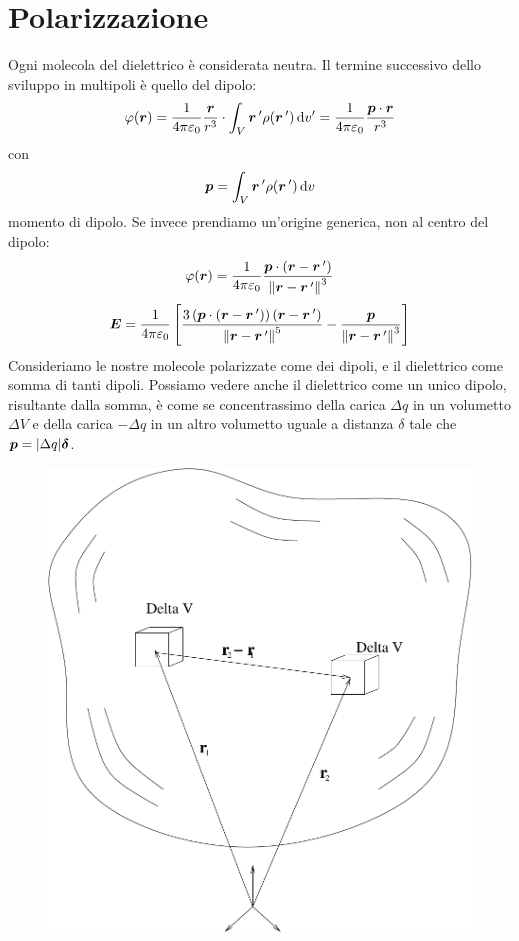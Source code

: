 \section{Polarizzazione}
Ogni molecola del dielettrico è considerata neutra. Il termine successivo dello sviluppo in multipoli è quello del dipolo:
\begin{equation}
  \varphi(\boldsymbol{r})=\frac{1}{4\pi\varepsilon_0}\frac{\boldsymbol{r}}{r^3}\cdot\int_V\boldsymbol{r}\,'\rho(\boldsymbol{r}\,')\,\mathrm{d} v'=\frac{1}{4\pi\varepsilon_0}\frac{\boldsymbol{p}\cdot\boldsymbol{r}}{r^3}
\end{equation}
con
\begin{equation}
  \boldsymbol{p}=\int_V \boldsymbol{r}\,'\rho(\boldsymbol{r}\,')\,\mathrm{d} v
\end{equation}
momento di dipolo. Se invece prendiamo un'origine generica, non al centro del dipolo:
\begin{equation}
  \varphi(\boldsymbol{r})=\frac{1}{4\pi\varepsilon_0}\frac{\boldsymbol{p}\cdot\left(\boldsymbol{r}-\boldsymbol{r}\,'\right)}{\left\lVert\boldsymbol{r}-\boldsymbol{r}\,'\right\rVert^3}
  \label{dipolo_scentrato}
\end{equation}
\begin{equation}
  \boldsymbol{E}=\frac{1}{4\pi\varepsilon_0}\left[\frac{3\left(\boldsymbol{p}\cdot\left(\boldsymbol{r}-\boldsymbol{r}\,'\right)\right)\left(\boldsymbol{r}-\boldsymbol{r}\,'\right)}{{\left\lVert\boldsymbol{r}-\boldsymbol{r}\,'\right\rVert}^5}-\frac{\boldsymbol{p}}{{\left\lVert\boldsymbol{r}-\boldsymbol{r}\,'\right\rVert}^3}\right]
\end{equation}
Consideriamo le nostre molecole polarizzate come dei dipoli, e il dielettrico come somma di tanti dipoli. Possiamo vedere anche il dielettrico come un unico dipolo, risultante dalla somma, è come se concentrassimo della carica $\Delta q$ in un volumetto $\Delta V$ e della carica $-\Delta q$ in un altro volumetto uguale a distanza $\delta$ tale che $\boldsymbol{p}=|\Delta q|\boldsymbol{\delta}$.
\begin{figure}[htbp]
  \centering
  \includegraphics[scale=0.3]{immagini/fisica2/distr_dipoli}
\end{figure}
